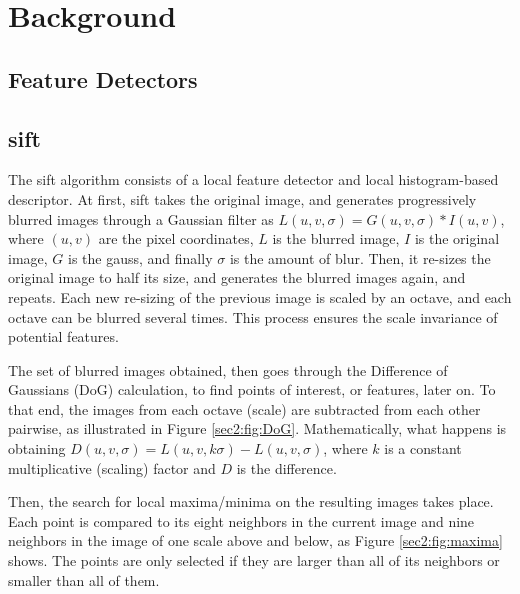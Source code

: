 
\chapter{Background}
\section{Feature Detectors}
\label{appendix:cha1}
\section{\acrlong{sift}}
\label{appendix:cha1:sift}
The \acrshort{sift} algorithm consists of a local feature detector and local histogram-based descriptor. At first, \acrshort{sift} takes the original image, and generates progressively blurred images through a Gaussian filter as $L (u , v , \sigma ) = G ( u , v, \sigma ) * I ( u , v )$, where $(u, v)$ are the pixel coordinates, $L$ is the blurred image, $I$ is the original image, $G$ is the \gls{gauss}, and finally $\sigma$ is the amount of blur. Then, it re-sizes the original image to half its size, and generates the blurred images again, and repeats. Each new re-sizing of the previous image is scaled by an octave, and each octave can be blurred  several times. This process ensures the scale invariance of potential features.

The set of blurred images obtained, then goes through the Difference of Gaussians (DoG) calculation, to find points of interest, or features, later on. To that end, the images from each octave (scale) are subtracted from each other pairwise, as illustrated in Figure \ref{sec2:fig:DoG}. Mathematically, what happens is obtaining $D ( u , v , \sigma ) = L ( u , v , k \sigma ) - L ( u , v , \sigma )$, where $k$ is a constant multiplicative (scaling) factor and $D$ is the difference.

Then, the search for local maxima/minima on the resulting images takes place. Each point is compared to its eight neighbors in the current image and nine neighbors in the image of one scale above and below, as Figure \ref{sec2:fig:maxima} shows. The points are only selected if they are larger than all of its neighbors or smaller than all of them.


